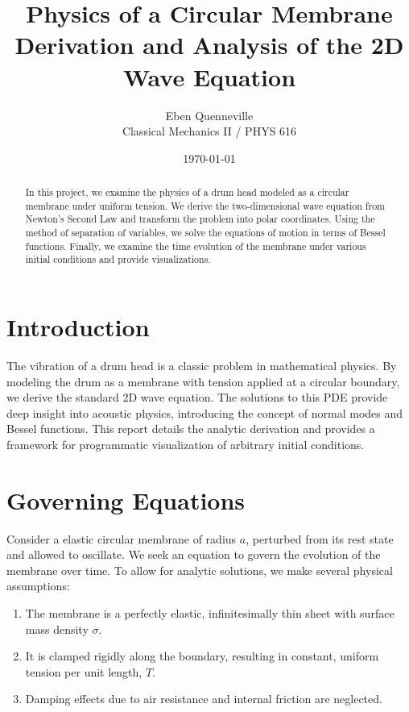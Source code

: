 \documentclass[11pt, letterpaper]{article}
\title{\textbf{Physics of a Circular Membrane}\\ \large Derivation and Analysis of the 2D Wave Equation}
\author{Eben Quenneville \\ Classical Mechanics II / PHYS 616}
\date{\today}
\begin{document}
\maketitle

\begin{abstract}
    In this project, we examine the physics of a drum head modeled as a circular membrane under uniform tension. We derive the two-dimensional wave equation from Newton's Second Law and transform the problem into polar coordinates. Using the method of separation of variables, we solve the equations of motion in terms of Bessel functions. Finally, we examine the time evolution of the membrane under various initial conditions and provide visualizations.
\end{abstract}

\tableofcontents
\newpage

\section{Introduction}

The vibration of a drum head is a classic problem in mathematical physics. By modeling the drum as a membrane with tension applied at a circular boundary, we derive the standard 2D wave equation. The solutions to this PDE provide deep insight into acoustic physics, introducing the concept of normal modes and Bessel functions. This report details the analytic derivation and provides a framework for programmatic visualization of arbitrary initial conditions.

\section{Governing Equations}

Consider a elastic circular membrane of radius $a$, perturbed from its rest state and allowed to oscillate.
We seek an equation to govern the evolution of the membrane over time.
To allow for analytic solutions, we make several physical assumptions:
\begin{enumerate}
    \item The membrane is a perfectly elastic, infinitesimally thin sheet with surface mass density $\sigma$.
    \item It is clamped rigidly along the boundary, resulting in constant, uniform tension per unit length, $T$.
    \item Damping effects due to air resistance and internal friction are neglected.
\end{enumerate}
\end{document}
